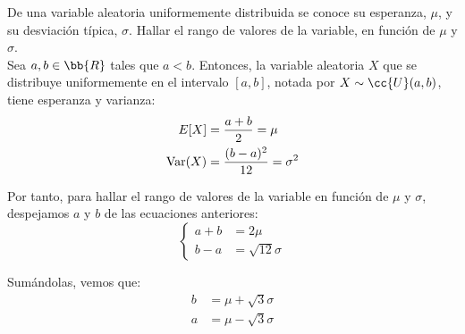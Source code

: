 \begin{ejercicio}
    De una variable aleatoria uniformemente distribuida se conoce su esperanza, $\mu$, y su desviación típica, $\sigma$. Hallar el rango de valores de la variable, en función de $\mu$ y $\sigma$.\\

    Sea $a,b\in \bb{R}$ tales que $a<b$. Entonces, la variable aleatoria $X$ que se distribuye uniformemente en el intervalo $\left[a,b\right]$, notada por $X\sim \cc{U}(a,b)$, tiene esperanza y varianza:
    \begin{align*}
        E[X] &= \dfrac{a+b}{2} = \mu\\
        \operatorname{Var}(X) &= \dfrac{(b-a)^2}{12} = \sigma^2
    \end{align*}

    Por tanto, para hallar el rango de valores de la variable en función de $\mu$ y $\sigma$, despejamos $a$ y $b$ de las ecuaciones anteriores:
    \begin{equation*}
        \left\{
            \begin{aligned}
                a+b &= 2\mu\\
                b-a &= \sqrt{12}\sigma
            \end{aligned}
        \right.
    \end{equation*}

    Sumándolas, vemos que:
    \begin{align*}
        b &= \mu + \sqrt{3}\sigma \\
        a &= \mu - \sqrt{3}\sigma
    \end{align*}
\end{ejercicio}


